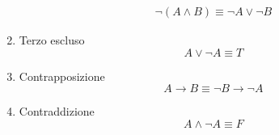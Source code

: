 \begin{enumerate}
\begin{align*}
                \neg(A \land B)  \equiv  \neg A \lor \neg B
            \end{align*}
    \item Terzo escluso
            \begin{equation*}
                A \lor \neg A \equiv T
            \end{equation*}
    \item Contrapposizione
            \begin{equation*}
                A \rightarrow B \equiv \neg B \rightarrow \neg A
            \end{equation*}
    \item Contraddizione
            \begin{equation*}
                A \land \neg A \equiv F
            \end{equation*}
\end{enumerate}
